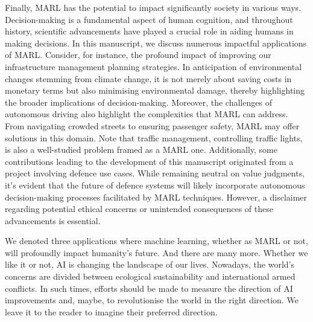 Finally, MARL has the potential to impact significantly society in various ways.
Decision-making is a fundamental aspect of human cognition, and throughout history, scientific advancements have played a crucial role in aiding humans in making decisions.
In this manuscript, we discuss numerous impactful applications of MARL.
Consider, for instance, the profound impact of improving our infrastructure management planning strategies.
In anticipation of environmental changes stemming from climate change, it is not merely about saving costs in monetary terms but also minimising environmental damage, thereby highlighting the broader implications of decision-making.
Moreover, the challenges of autonomous driving also highlight the complexities that MARL can address.
From navigating crowded streets to ensuring passenger safety, MARL may offer solutions in this domain.
Note that traffic management, controlling traffic lights, is also a well-studied problem framed as a MARL one.
Additionally, some contributions leading to the development of this manuscript originated from a project involving defence use cases.
While remaining neutral on value judgments, it's evident that the future of defence systems will likely incorporate autonomous decision-making processes facilitated by MARL techniques.
However, a disclaimer regarding potential ethical concerns or unintended consequences of these advancements is essential.

We denoted three applications where machine learning, whether as MARL or not, will profoundly impact humanity's future.
And there are many more.
Whether we like it or not, AI is changing the landscape of our lives.
Nowadays, the world's concerns are divided between ecological sustainability and international armed conflicts.
In such times, efforts should be made to measure the direction of AI improvements and, maybe, to revolutionise the world in the right direction.
We leave it to the reader to imagine their preferred direction.